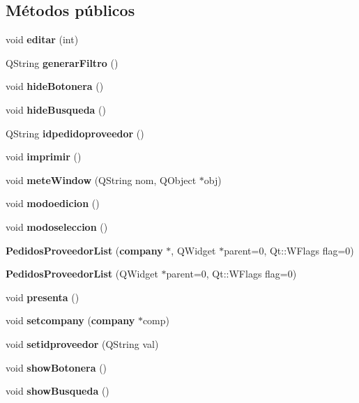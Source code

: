 \subsection*{M\'{e}todos p\'{u}blicos}
\begin{CompactItemize}
\item 
void {\bf editar} (int)\label{classPedidosProveedorList_a0}

\item 
QString {\bf generar\-Filtro} ()
\item 
void {\bf hide\-Botonera} ()\label{classPedidosProveedorList_a2}

\item 
void {\bf hide\-Busqueda} ()\label{classPedidosProveedorList_a3}

\item 
QString {\bf idpedidoproveedor} ()\label{classPedidosProveedorList_a4}

\item 
void {\bf imprimir} ()\label{classPedidosProveedorList_a5}

\item 
void {\bf mete\-Window} (QString nom, QObject $\ast$obj)\label{classPedidosProveedorList_a6}

\item 
void {\bf modoedicion} ()\label{classPedidosProveedorList_a7}

\item 
void {\bf modoseleccion} ()\label{classPedidosProveedorList_a8}

\item 
{\bf Pedidos\-Proveedor\-List} ({\bf company} $\ast$, QWidget $\ast$parent=0, Qt::WFlags flag=0)\label{classPedidosProveedorList_a9}

\item 
{\bf Pedidos\-Proveedor\-List} (QWidget $\ast$parent=0, Qt::WFlags flag=0)\label{classPedidosProveedorList_a10}

\item 
void {\bf presenta} ()
\item 
void {\bf setcompany} ({\bf company} $\ast$comp)\label{classPedidosProveedorList_a12}

\item 
void {\bf setidproveedor} (QString val)\label{classPedidosProveedorList_a13}

\item 
void {\bf show\-Botonera} ()\label{classPedidosProveedorList_a14}

\item 
void {\bf show\-Busqueda} ()\label{classPedidosProveedorList_a15}

\end{CompactItemize}


